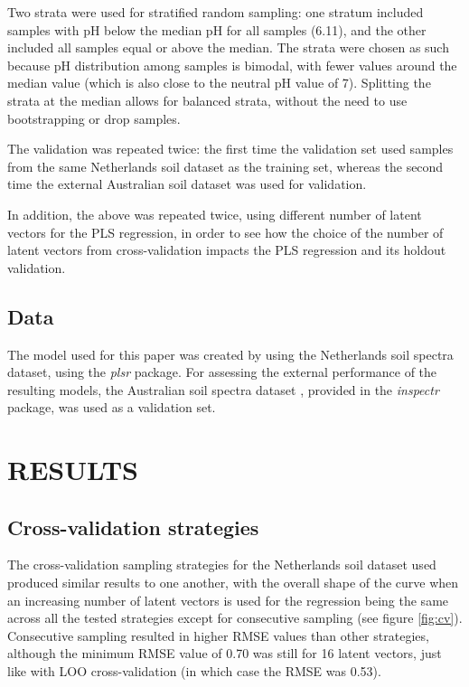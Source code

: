 \documentclass{isprs}
\begin{document}
Two strata were used for stratified random sampling: one stratum included samples with pH below the median pH for all samples (6.11), and the other included all samples equal or above the median. The strata were chosen as such because pH distribution among samples is bimodal, with fewer values around the median value (which is also close to the neutral pH value of 7). Splitting the strata at the median allows for balanced strata, without the need to use bootstrapping or drop samples.

The validation was repeated twice: the first time the validation set used samples from the same Netherlands soil dataset as the training set, whereas the second time the external Australian soil dataset was used for validation.

In addition, the above was repeated twice, using different number of latent vectors for the PLS regression, in order to see how the choice of the number of latent vectors from cross-validation impacts the PLS regression and its holdout validation.

\subsection{Data}\label{sec:Data}

The model used for this paper was created by using the Netherlands soil spectra dataset, using the \textit{plsr} package. For assessing the external performance of the resulting models, the Australian soil spectra dataset \cite{rossel2010using}, provided in the \textit{inspectr} package, was used as a validation set.

\section{RESULTS}\label{sec:RESULTS}

\subsection{Cross-validation strategies}\label{sec:Cross-validation strategies 2}

The cross-validation sampling strategies for the Netherlands soil dataset used produced similar results to one another, with the overall shape of the curve when an increasing number of latent vectors is used for the regression being the same across all the tested strategies except for consecutive sampling (see figure \ref{fig:cv}). Consecutive sampling resulted in higher RMSE values than other strategies, although the minimum RMSE value of 0.70 was still for 16 latent vectors, just like with LOO cross-validation (in which case the RMSE was 0.53).
\end{document}
